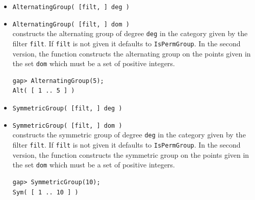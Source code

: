 \documentclass[11pt]{amsart}
\theoremstyle{plain}
\newcommand{\codesize}{\footnotesize}
\newcommand{\<}{\ensuremath{\langle}}
\renewcommand{\>}{\ensuremath{\rangle}}
\begin{document}
\begin{itemize}
\item {\tt AlternatingGroup( [filt, ] deg )}
\item {\tt AlternatingGroup( [filt, ] dom )}\\[2pt] 
constructs the alternating group of degree {\tt deg} in the category given by the
filter {\tt filt}. 
If {\tt filt} is not given it defaults to {\tt IsPermGroup}.
In the second version, the function constructs the alternating group on the points
given in the set {\tt dom} which must be a set of positive integers.
{\codesize
\begin{verbatim}
gap> AlternatingGroup(5);
Alt( [ 1 .. 5 ] )
\end{verbatim}}
\item {\tt SymmetricGroup( [filt, ] deg )}
\item {\tt SymmetricGroup( [filt, ] dom )}\\[2pt] 
constructs the symmetric group of degree {\tt deg} in the category given by the
filter {\tt filt}. 
If {\tt filt} is not given it defaults to {\tt IsPermGroup}.
In the second version, the function constructs the symmetric group on the points
given in the set {\tt dom} which must be a set of positive integers.
{\codesize
\begin{verbatim}
gap> SymmetricGroup(10);
Sym( [ 1 .. 10 ] )
\end{verbatim}}
\end{itemize}

\newpage
\end{document}
